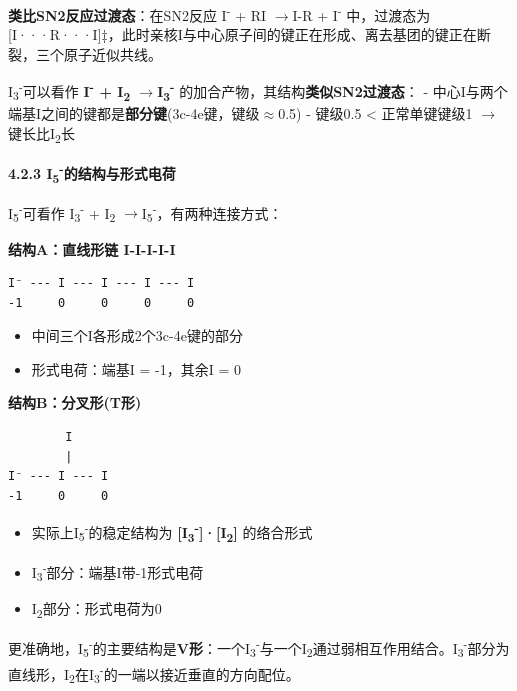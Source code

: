 \documentclass[a4paper,11pt]{ctexart}
\providecommand{\tightlist}{\setlength{\itemsep}{0pt}\setlength{\parskip}{0pt}}
\newcommand{\箭}{\ensuremath{\rightarrow}}
\newcommand{\左箭}{\ensuremath{\leftarrow}}
\newcommand{\上箭}{\ensuremath{\uparrow}}
\newcommand{\下箭}{\ensuremath{\downarrow}}
\newcommand{\衡}{\ensuremath{\rightleftharpoons}}
\newcommand{\双箭}{\ensuremath{\leftrightarrow}}
\newcommand{\约等于}{\ensuremath{\approx}}
\newcommand{\小于等于}{\ensuremath{\leq}}
\newcommand{\大于等于}{\ensuremath{\geq}}
\newcommand{\不等于}{\ensuremath{\neq}}
\newcommand{\西格马}{\ensuremath{\sigma}}
\newcommand{\派}{\ensuremath{\pi}}
\begin{document}
\textbf{类比SN2反应过渡态}：在SN2反应 I\textsuperscript{-} + RI \箭 I-R + I\textsuperscript{-} 中，过渡态为 {[}I···R···I{]}‡，此时亲核I与中心原子间的键正在形成、离去基团的键正在断裂，三个原子近似共线。

I\textsubscript{3}\textsuperscript{-}可以看作 \textbf{I\textsuperscript{-} + I\textsubscript{2} \箭 I\textsubscript{3}\textsuperscript{-}} 的加合产物，其结构\textbf{类似SN2过渡态}：
- 中心I与两个端基I之间的键都是\textbf{部分键}(3c-4e键，键级\约等于0.5)
- 键级0.5 \textless{} 正常单键键级1 \箭 键长比I\textsubscript{2}长

\textbf{4.2.3 I\textsubscript{5}\textsuperscript{-}的结构与形式电荷}

I\textsubscript{5}\textsuperscript{-}可看作 I\textsubscript{3}\textsuperscript{-} + I\textsubscript{2} \箭 I\textsubscript{5}\textsuperscript{-}，有两种连接方式：

\textbf{结构A：直线形链 I-I-I-I-I}

\begin{verbatim}
I⁻ --- I --- I --- I --- I
-1     0     0     0     0
\end{verbatim}

\begin{itemize}
\tightlist
\item
  中间三个I各形成2个3c-4e键的部分
\item
  形式电荷：端基I = -1，其余I = 0
\end{itemize}

\textbf{结构B：分叉形(T形)}

\begin{verbatim}
        I
        |
I⁻ --- I --- I
-1     0     0
\end{verbatim}

\begin{itemize}
\tightlist
\item
  实际上I\textsubscript{5}\textsuperscript{-}的稳定结构为 \textbf{{[}I\textsubscript{3}\textsuperscript{-}{]}·{[}I\textsubscript{2}{]}} 的络合形式
\item
  I\textsubscript{3}\textsuperscript{-}部分：端基I带-1形式电荷
\item
  I\textsubscript{2}部分：形式电荷为0
\end{itemize}

更准确地，I\textsubscript{5}\textsuperscript{-}的主要结构是\textbf{V形}：一个I\textsubscript{3}\textsuperscript{-}与一个I\textsubscript{2}通过弱相互作用结合。I\textsubscript{3}\textsuperscript{-}部分为直线形，I\textsubscript{2}在I\textsubscript{3}\textsuperscript{-}的一端以接近垂直的方向配位。
\end{document}
